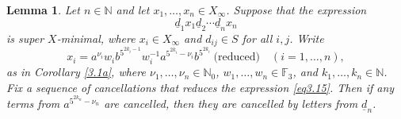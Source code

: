 \documentclass[twoside,11pt]{amsart}
\numberwithin{equation}{section}
\newtheorem{lemma}[theorem]{Lemma}
\theoremstyle{definition}
\newcommand {\N}{\mathbb N}
\newcommand{\1}{\mathbbm{1}}
\newcommand{\F}{\mathbb F}
\newcommand{\pdt}{\underline}
\begin{document}
	
	
	\begin{lemma}		\label{3.7} 
		Let $n \in \N$ and let $x_1, \ldots, x_n \in X_\infty$. Suppose that the expression
		\begin{equation}	\label{eq3.15}
			\pdt{d}_1x_1 \pdt{d}_2 \cdots \pdt{d}_n x_n
		\end{equation}
		is super $X$-minimal, where $x_i \in X_\infty$ and $d_{ij} \in S$ for all $i,j$. Write 
		$$x_i = a^{\nu_i}w_ib^{5^{2k_i-1}}w_i^{-1}a^{5^{2k_i} - \nu_i}b^{5^{2k_i}} \ \text{(reduced)} \quad (i = 1, \ldots, n),$$
		as in Corollary \ref{3.1a}, where $\nu_1, \ldots, \nu_n \in \N_0$, $w_1, \ldots, w_n \in \F_3$, and $k_1, \ldots, k_n \in \N$.			
		Fix a sequence of cancellations that reduces the expression \eqref{eq3.15}.
		Then if any terms from $a^{5^{2k_n} - \nu_n}$ are cancelled, then they are cancelled by letters from $\pdt{d}_n$.	
	\end{lemma}
	
\end{document}
